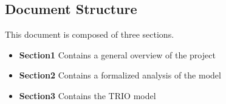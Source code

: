 \subsection{Document Structure}

This document is composed of three sections.
\begin{itemize}
	\item \textbf{Section1} Contains a general overview of the project
	\item \textbf{Section2} Contains a formalized analysis of the model
	\item \textbf{Section3} Contains the TRIO model
\end{itemize}
